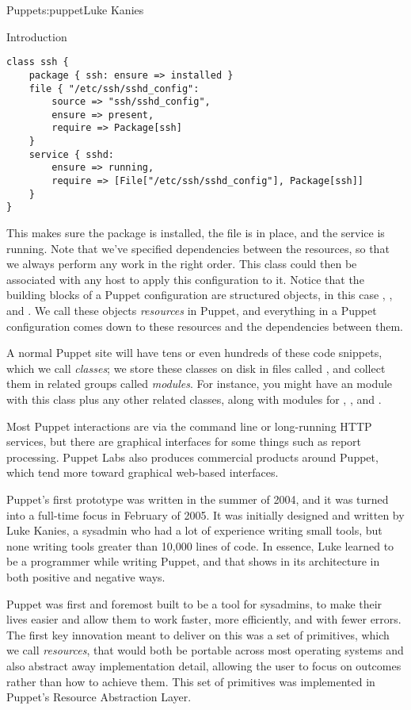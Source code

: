 \begin{aosachapter}{Puppet}{s:puppet}{Luke Kanies}
\begin{aosasect1}{Introduction}
\begin{verbatim}
class ssh {
    package { ssh: ensure => installed }
    file { "/etc/ssh/sshd_config":
        source => "ssh/sshd_config",
        ensure => present,
        require => Package[ssh]
    }
    service { sshd:
        ensure => running,
        require => [File["/etc/ssh/sshd_config"], Package[ssh]]
    }
}
\end{verbatim}

\noindent This makes sure the package is installed, the file is in place, and
the service is running.  Note that we've specified dependencies
between the resources, so that we always perform any work in the right
order.  This class could then be associated with any host to apply
this configuration to it.  Notice that the building blocks of a Puppet
configuration are structured objects, in this case , ,
and .  We call these objects \emph{resources} in Puppet, and
everything in a Puppet configuration comes down to these resources and
the dependencies between them.

A normal Puppet site will have tens or even hundreds of these code
snippets, which we call \emph{classes}; we store these classes on disk in
files called , and collect them in related groups called
\emph{modules}. For instance, you might have an  module with this
 class plus any other related classes, along with modules for
, , and .

Most Puppet interactions are via the command line or long-running HTTP
services, but there are graphical interfaces for some things such as
report processing.  Puppet Labs also produces commercial products
around Puppet, which tend more toward graphical web-based interfaces.

Puppet's first prototype was written in the summer of 2004, and it was
turned into a full-time focus in February of 2005.  It was initially
designed and written by Luke Kanies, a sysadmin who had a lot of
experience writing small tools, but none writing tools greater than
10,000 lines of code.  In essence, Luke learned to be a programmer
while writing Puppet, and that shows in its architecture in both positive and negative
ways.

Puppet was first and foremost built to be a tool for sysadmins, to 
make their lives easier and allow them to work
faster, more efficiently, and with fewer errors.  The first key
innovation meant to deliver on this was a set of primitives, which we
call \emph{resources}, that would both be portable across most operating
systems and also abstract away implementation detail, allowing the
user to focus on outcomes rather than how to achieve them.  This set
of primitives was implemented in Puppet's Resource Abstraction Layer.


\end{aosasect1}
\end{aosachapter}
